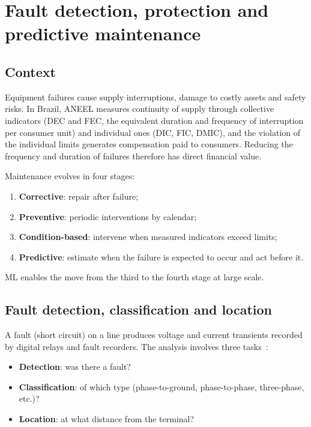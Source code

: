 \documentclass[10pt,a4paper,oneside]{article}
\begin{document}
\section{Fault detection, protection and predictive maintenance}

\subsection{Context}

Equipment failures cause supply interruptions, damage to costly assets and
safety risks. In Brazil, ANEEL measures continuity of supply through
collective indicators (DEC and FEC, the equivalent duration and frequency of
interruption per consumer unit) and individual ones (DIC, FIC, DMIC), and
the violation of the individual limits generates compensation paid to
consumers. Reducing the frequency and duration of failures therefore has
direct financial value.

Maintenance evolves in four stages:
\begin{enumerate}
  \item \textbf{Corrective}: repair after failure;
  \item \textbf{Preventive}: periodic interventions by calendar;
  \item \textbf{Condition-based}: intervene when measured indicators exceed
    limits;
  \item \textbf{Predictive}: estimate when the failure is expected to occur
    and act before it.
\end{enumerate}
ML enables the move from the third to the fourth stage at large scale.

\subsection{Fault detection, classification and location}

A fault (short circuit) on a line produces voltage and current transients
recorded by digital relays and fault recorders. The analysis involves three
tasks~\cite{faultsurvey}:
\begin{itemize}
  \item \textbf{Detection}: was there a fault?
  \item \textbf{Classification}: of which type (phase-to-ground,
    phase-to-phase, three-phase, etc.)?
  \item \textbf{Location}: at what distance from the terminal?
\end{itemize}
\end{document}
